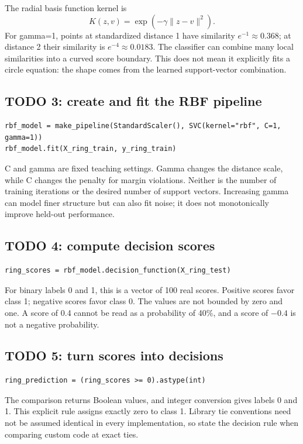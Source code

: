 The radial basis function kernel is
\[K(z,v)=\exp(-\gamma\|z-v\|^2).\]
For gamma=1, points at standardized distance 1 have similarity $e^{-1}\approx0.368$;
at distance 2 their similarity is $e^{-4}\approx0.0183$.
The classifier can combine many local similarities into a curved score boundary. This does not mean it
explicitly fits a circle equation: the shape comes from the learned support-vector combination.

\subsection{TODO 3: create and fit the RBF pipeline}
\begin{lstlisting}
rbf_model = make_pipeline(StandardScaler(), SVC(kernel="rbf", C=1, gamma=1))
rbf_model.fit(X_ring_train, y_ring_train)
\end{lstlisting}
C and gamma are fixed teaching settings. Gamma changes the distance scale, while C changes the penalty for
margin violations. Neither is the number of training iterations or the desired number of support vectors.
Increasing gamma can model finer structure but can also fit noise; it does not monotonically improve held-out performance.

\subsection{TODO 4: compute decision scores}
\begin{lstlisting}
ring_scores = rbf_model.decision_function(X_ring_test)
\end{lstlisting}
For binary labels 0 and 1, this is a vector of 100 real scores. Positive scores favor class 1;
negative scores favor class 0. The values are not bounded by zero and one.
A score of 0.4 cannot be read as a probability of 40\%, and a score of $-0.4$ is not a negative probability.

\subsection{TODO 5: turn scores into decisions}
\begin{lstlisting}
ring_prediction = (ring_scores >= 0).astype(int)
\end{lstlisting}
The comparison returns Boolean values, and integer conversion gives labels 0 and 1.
This explicit rule assigns exactly zero to class 1. Library tie conventions need not be assumed identical
in every implementation, so state the decision rule when comparing custom code at exact ties.

